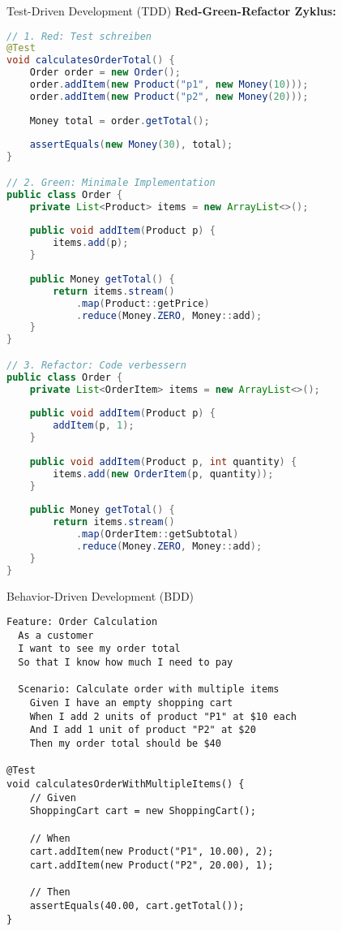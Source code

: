 \begin{KR}{Test-Driven Development (TDD)}
\textbf{Red-Green-Refactor Zyklus:}
\begin{lstlisting}[language=Java]
// 1. Red: Test schreiben
@Test
void calculatesOrderTotal() {
    Order order = new Order();
    order.addItem(new Product("p1", new Money(10)));
    order.addItem(new Product("p2", new Money(20)));
    
    Money total = order.getTotal();
    
    assertEquals(new Money(30), total);
}

// 2. Green: Minimale Implementation
public class Order {
    private List<Product> items = new ArrayList<>();
    
    public void addItem(Product p) {
        items.add(p);
    }
    
    public Money getTotal() {
        return items.stream()
            .map(Product::getPrice)
            .reduce(Money.ZERO, Money::add);
    }
}

// 3. Refactor: Code verbessern
public class Order {
    private List<OrderItem> items = new ArrayList<>();
    
    public void addItem(Product p) {
        addItem(p, 1);
    }
    
    public void addItem(Product p, int quantity) {
        items.add(new OrderItem(p, quantity));
    }
    
    public Money getTotal() {
        return items.stream()
            .map(OrderItem::getSubtotal)
            .reduce(Money.ZERO, Money::add);
    }
}
\end{lstlisting}
\end{KR}

\begin{example}{Behavior-Driven Development (BDD)}
\begin{lstlisting}[style=basesmol]
Feature: Order Calculation
  As a customer
  I want to see my order total
  So that I know how much I need to pay

  Scenario: Calculate order with multiple items
    Given I have an empty shopping cart
    When I add 2 units of product "P1" at $10 each
    And I add 1 unit of product "P2" at $20
    Then my order total should be $40

@Test
void calculatesOrderWithMultipleItems() {
    // Given
    ShoppingCart cart = new ShoppingCart();
    
    // When
    cart.addItem(new Product("P1", 10.00), 2);
    cart.addItem(new Product("P2", 20.00), 1);
    
    // Then
    assertEquals(40.00, cart.getTotal());
}
\end{lstlisting}
\end{example}

